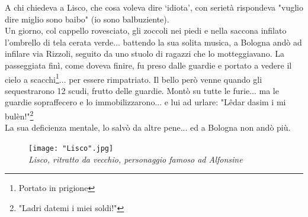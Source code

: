\documentclass[10pt]{memoir} %
\begin{document}
A chi chiedeva a Lisco, che cosa voleva dire ‘idiota', con serietà rispondeva "vuglio dire miglio sono baibo" (io sono balbuziente).\\
Un giorno, col cappello rovesciato, gli zoccoli nei piedi e nella saccona infilato l'ombrello di tela cerata verde... battendo la sua solita musica, a Bologna andò ad infilare via Rizzoli, seguito da uno stuolo di ragazzi che lo motteggiavano. La passeggiata finì, come doveva finire, fu preso dalle guardie e portato a vedere il cielo a scacchi\footnote{Portato in prigione}... per essere rimpatriato. Il bello però venne quando gli sequestrarono 12 scudi, frutto delle guardie. Montò su tutte le furie... ma le guardie sopraffecero e lo immobilizzarono... e lui ad urlare: "Lêdar dasim i mi bulèn!"\footnote{"Ladri datemi i miei soldi!"}\\
La sua deficienza mentale, lo salvò da altre pene... ed a Bologna non andò più.\\

\begin{figure}[H]
\begin{center}
\vspace{-10pt}
   \texttt{[image: "Lisco".jpg]}\\
	\emph{Lisco, ritratto da vecchio, personaggio famoso ad Alfonsine}
  \end{center}
\end{figure}



\end{document}
